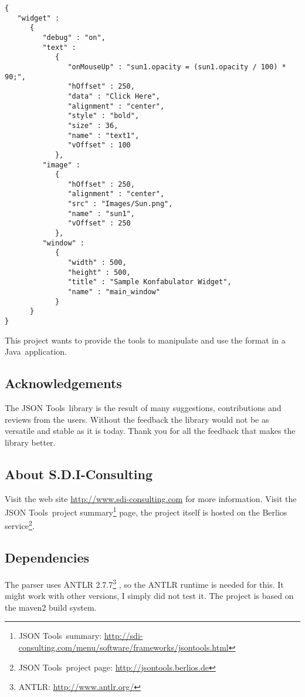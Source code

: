 \documentclass[a4paper]{article}
\newcommand{\jtools}{JSON Tools}
\newcommand{\java}{Java}
\begin{document}
\medskip
\begin{lstlisting}
{
   "widget" :
      {
         "debug" : "on",
         "text" :
            {
               "onMouseUp" : "sun1.opacity = (sun1.opacity / 100) * 90;",
               "hOffset" : 250,
               "data" : "Click Here",
               "alignment" : "center",
               "style" : "bold",
               "size" : 36,
               "name" : "text1",
               "vOffset" : 100
            },
         "image" :
            {
               "hOffset" : 250,
               "alignment" : "center",
               "src" : "Images/Sun.png",
               "name" : "sun1",
               "vOffset" : 250
            },
         "window" :
            {
               "width" : 500,
               "height" : 500,
               "title" : "Sample Konfabulator Widget",
               "name" : "main_window"
            }
      }
}
\end{lstlisting}
\medskip

This project wants to provide the tools to manipulate and use the format in a \java\ application. 

\subsection{Acknowledgements}
The \jtools\ library is the result of many suggestions, contributions and reviews from the users. Without the feedback the library would not be as versatile and stable as it is today. Thank you for all the feedback that makes the library better.

\subsection{About S.D.I-Consulting}

Visit the web site \url{http://www.sdi-consulting.com} for more information.
Visit the \jtools\ project summary\footnote{\jtools\ summary: \url{http://sdi-consulting.com/menu/software/frameworks/jsontools.html}} page, the project itself is hosted on the Berlios service\footnote{\jtools\  project page: \url{http://jsontools.berlios.de}}.

\subsection{Dependencies}

The parser uses ANTLR  2.7.7\footnote{ANTLR: \url{http://www.antlr.org/}} , so the ANTLR runtime is needed for this. It might work with other versions, I simply did not test it. The project is based on the maven2 build system. 
\end{document}
